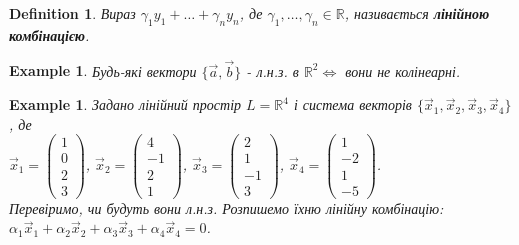 \documentclass[a4paper, 10pt]{article}
\theoremstyle{theoremdd}
\newtheorem{definition}[theorem]{Definition}
\newtheorem{example}[theorem]{Example}
\begin{document}
	\begin{definition}
	Вираз $\gamma_1 y_1 + \dots + \gamma_n y_n$, де $\gamma_1, \dots, \gamma_n \in \mathbb{R}$, називається \textbf{лінійною комбінацією}.
	\end{definition}
	
	\begin{example}
	Будь-які вектори $\{\vec{a}, \vec{b} \}$ - л.н.з. в $\mathbb{R}^2 \iff $ вони не колінеарні.
	\end{example}
	
	\begin{example}
	Задано лінійний простір $L = \mathbb{R}^4$ і система векторів $\{\vec{x}_1,\vec{x}_2,\vec{x}_3,\vec{x}_4\}$, де\\
	$\vec{x}_1 =\begin{pmatrix} 1\\ 0\\ 2\\ 3 \end{pmatrix} $, $\vec{x}_2 =\begin{pmatrix} 4\\ -1\\ 2\\ 1 \end{pmatrix} $, $\vec{x}_3 =\begin{pmatrix} 2\\ 1\\ -1\\ 3 \end{pmatrix} $, $\vec{x}_4 =\begin{pmatrix} 1\\ -2\\ 1\\ -5 \end{pmatrix}$.\\
	Перевіримо, чи будуть вони л.н.з. Розпишемо їхню лінійну комбінацію:\\
	$\alpha_1 \vec{x}_1 + \alpha_2 \vec{x}_2 + \alpha_3 \vec{x}_3 + \alpha_4 \vec{x}_4 = 0$.\\

\end{example}
\end{document}
